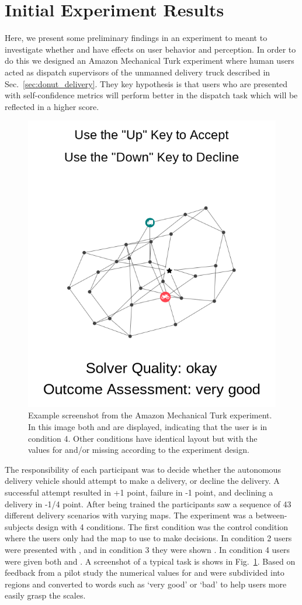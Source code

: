 \section{Initial Experiment Results} \label{sec:exp_results}
Here, we present some preliminary findings in an experiment to meant to investigate whether \xQ{} and \xO{} have effects on user behavior and perception. In order to do this we designed an Amazon Mechanical Turk experiment where human users acted as dispatch supervisors of the unmanned delivery truck described in Sec.~\ref{sec:donut_delivery}. They key hypothesis is that users who are presented with self-confidence metrics will perform better in the dispatch task which will be reflected in a higher score.

\begin{figure}[tbp]
    \centering
    \includegraphics[width=0.5\linewidth]{Figures/experiment_screenshot.png}
    \caption{Example screenshot from the Amazon Mechanical Turk experiment.  In this image both \xQ{} and \xP{} are displayed, indicating that the user is in condition 4. Other conditions have identical layout but with the values for \xQ{} and/or \xP{} missing according to the experiment design. } 
    \label{fig:experiment_screenshot}
\end{figure}

The responsibility of each participant was to decide whether the autonomous delivery vehicle should attempt to make a delivery, or decline the delivery. A successful attempt resulted in +1 point, failure in -1 point, and declining a delivery in -1/4 point. After being trained the participants saw a sequence of 43 different delivery scenarios with varying maps. The experiment was a between-subjects design with 4 conditions. The first condition was the control condition where the users only had the map to use to make decisions. In condition 2 users were presented with \xQ{}, and in condition 3 they were shown \xP{}. In condition 4 users were given both \xQ{} and \xP. A screenshot of a typical task is shows in Fig.~\ref{fig:experiment_screenshot}. Based on feedback from a pilot study the numerical values for \xQ{} and \xP{} were subdivided into regions and converted to words such as `very good' or `bad' to help users more easily grasp the scales.

